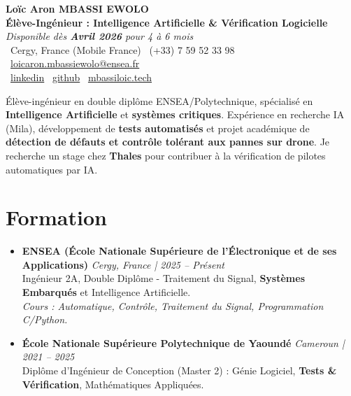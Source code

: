 \documentclass[a4paper,11pt]{article}
\begin{document}
\begin{center}
    {\Large \textbf{Loïc Aron MBASSI EWOLO}} \\ \vspace{4pt}
    \textbf{\large Élève-Ingénieur : Intelligence Artificielle \& Vérification Logicielle} \\
    \textit{\small Disponible dès \textbf{Avril 2026} pour 4 à 6 mois} \\ \vspace{4pt}
    \small
    \faMapMarker\ Cergy, France (Mobile France) \quad
    \faPhone\ (+33) 7 59 52 33 98 \quad
    \faEnvelope\ \href{mailto:loicaron.mbassiewolo@ensea.fr}{loicaron.mbassiewolo@ensea.fr} \\ \vspace{2pt}
    \faLinkedin\ \href{https://www.linkedin.com/in/loic-aron-mbassi-ewolo-3942a9246/}{linkedin} \quad
    \faGithub\ \href{https://github.com/Nameless0l}{github} \quad
    \faGlobe\ \href{https://mbassiloic.tech}{mbassiloic.tech}
\end{center}

\vspace{-6pt}

\noindent\small{Élève-ingénieur en double diplôme ENSEA/Polytechnique, spécialisé en \textbf{Intelligence Artificielle} et \textbf{systèmes critiques}. Expérience en recherche IA (Mila), développement de \textbf{tests automatisés} et projet académique de \textbf{détection de défauts et contrôle tolérant aux pannes sur drone}. Je recherche un stage chez \textbf{Thales} pour contribuer à la vérification de pilotes automatiques par IA.}

\section{Formation}
\begin{itemize}[leftmargin=*, label={.}, nosep]
    \item \textbf{ENSEA (École Nationale Supérieure de l'Électronique et de ses Applications)} \hfill \textit{Cergy, France | 2025 -- Présent} \\
    \small{Ingénieur 2A, Double Diplôme - Traitement du Signal, \textbf{Systèmes Embarqués} et Intelligence Artificielle.} \\
    \textit{\small{Cours : Automatique, Contrôle, Traitement du Signal, Programmation C/Python.}}
    \vspace{2pt}
    \item \textbf{École Nationale Supérieure Polytechnique de Yaoundé} \hfill \textit{Cameroun | 2021 -- 2025} \\
    \small{Diplôme d'Ingénieur de Conception (Master 2) : Génie Logiciel, \textbf{Tests \& Vérification}, Mathématiques Appliquées.}
\end{itemize}
\end{document}
